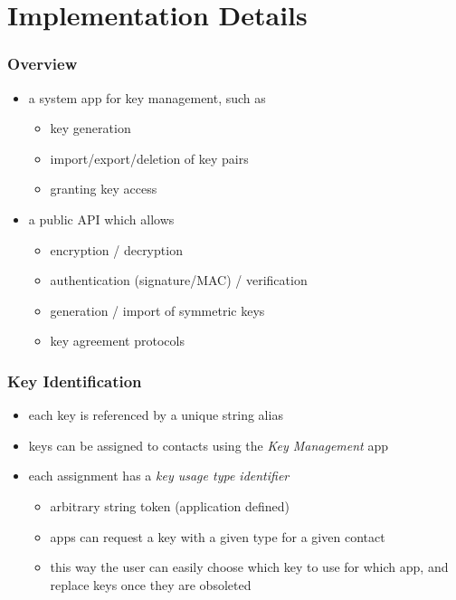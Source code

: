 \documentclass{beamer}
\begin{document}
\section{Implementation Details}
	\begin{frame}
		\tableofcontents[currentsection]
	\end{frame}
	\begin{frame}
		\frametitle{Overview}
		\begin{itemize}
			\item a system app for key management, such as
				\begin{itemize}
					\item key generation
					\item import/export/deletion of key pairs
					\item granting key access
				\end{itemize}
			\item a public API which allows
				\begin{itemize}
					\item encryption / decryption
					\item authentication (signature/MAC) / verification
					\item generation / import of symmetric keys
					\item key agreement protocols
				\end{itemize}
		\end{itemize}
	\end{frame}

	\begin{frame}
		\frametitle{Key Identification}
		\begin{itemize}
			\item each key is referenced by a unique string alias
			\item keys can be assigned to contacts using the {\em Key Management} app
			\item each assignment has a {\em key usage type identifier}
				\begin{itemize}
					\item arbitrary string token (application defined)
					\item apps can request a key with a given type for a given contact
					\item this way the user can easily choose which key to use for which app, and replace keys once they are obsoleted
				\end{itemize}
		\end{itemize}
	\end{frame}
\end{document}
